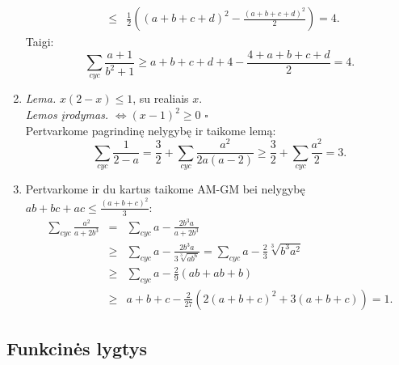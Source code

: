 \begin{enumerate}
\begin{eqnarray*}
&\leq&
\frac{1}{2}((a+b+c+d)^2-\frac{(a+b+c+d)^2}{2})=4.\end{eqnarray*}
Taigi: $$\sum_{cyc}{\frac{a+1}{b^2+1}}\geq
a+b+c+d+4-\frac{4+a+b+c+d}{2}=4.$$
\item 
\textit{Lema.} $x(2-x)\leq1$, su realiais $x$. \\ \noindent\textit{Lemos
įrodymas.} $\Leftrightarrow (x-1)^2\geq0$ \hfill{$\square$}
\\Pertvarkome pagrindinę nelygybę ir taikome lemą:
$$\sum_{cyc}{\frac{1}{2-a}}=\frac{3}{2}+\sum_{cyc}{\frac{a^2}{2a(a-2)}}\geq\frac{3}{2}+\sum_{cyc}{\frac{a^2}{2}}=3.$$
\item 
Pertvarkome ir du kartus taikome AM-GM bei nelygybę
$ab+bc+ac\leq\frac{(a+b+c)^2}{3}$:
\begin{eqnarray*}\sum_{cyc}{\frac{a^2}{a+2b^3}}&=&\sum_{cyc}{a-\frac{2b^3a}{a+2b^3}}\\
&\geq&\sum_{cyc}{a-\frac{2b^3a}{3\sqrt[3]{ab^6}}}=\sum_{cyc}{a-\frac{2}{3}\sqrt[3]{b^3a^2}}\\&\geq&\sum_{cyc}{a-\frac{2}{9}(ab+ab+b)}\\
&\geq&a+b+c-\frac{2}{27}\left(2(a+b+c)^2+3(a+b+c)\right)=1.\end{eqnarray*}
\end{enumerate} 
\subsection*{Funkcinės lygtys}

